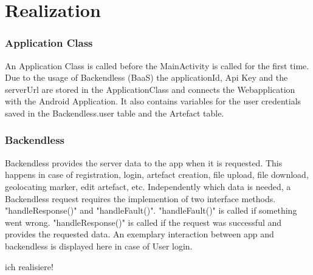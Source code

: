 \newpage
\chapter{Realization}\label{cap:Realization}
\subsection{Application Class}
An Application Class is called before the MainActivity is called for the first time. Due to the usage of Backendless (BaaS) the applicationId, Api Key and the serverUrl are stored in the ApplicationClass and connects the Webapplication with the Android Application. It also contains variables for the user credentials saved in the Backendless.user table and the Artefact table. 

\subsection{Backendless}
Backendless provides the server data to the app when it is requested. This happens in case of registration, login, artefact creation, file upload, file download, geolocating marker, edit artefact, etc.
Independently which data is needed, a Backendless request requires the implemention of two interface methods. "handleResponse()" and "handleFault()". "handleFault()" is called if something went wrong. "handleResponse()" is called if the request was successful and provides the requested data. 
An exemplary interaction between app and backendless is displayed here in case of User login.

\fbox{

}

ich realisiere!